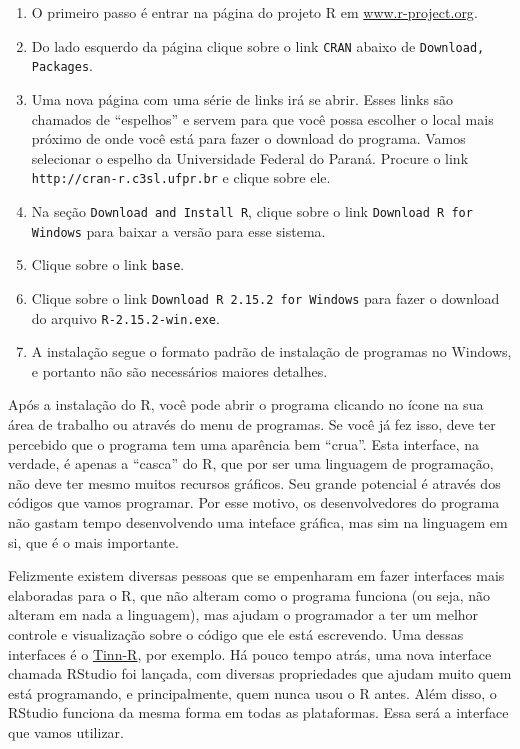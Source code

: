 \documentclass[a4paper,12pt]{article}\usepackage[]{graphicx}\usepackage[]{color}
\providecommand{\R}{\textsf{R}\xspace}
\providecommand{\RStudio}{\textsf{RStudio}\xspace}
\begin{document}
\begin{enumerate}
\item O primeiro passo é entrar na página do projeto \R em
\url{www.r-project.org}.
\item Do lado esquerdo da página clique sobre o link \texttt{CRAN}
  abaixo de \texttt{Download, Packages}.
\item Uma nova página com uma série de links irá se abrir. Esses links
  são chamados de ``espelhos'' e servem para que você possa escolher o
  local mais próximo de onde você está para fazer o download do
  programa. Vamos selecionar o espelho da Universidade Federal do
  Paraná. Procure o link \texttt{http://cran-r.c3sl.ufpr.br} e clique sobre
  ele.
\item Na seção \texttt{Download and Install R}, clique sobre o link
  \texttt{Download R for Windows} para baixar a versão para esse
  sistema.
\item Clique sobre o link \texttt{base}.
\item Clique sobre o link \texttt{Download R 2.15.2 for Windows} para
  fazer o download do arquivo \texttt{R-2.15.2-win.exe}.
\item A instalação segue o formato padrão de instalação de programas no
  Windows, e portanto não são necessários maiores detalhes.
\end{enumerate}

Após a instalação do \R, você pode abrir o programa clicando no ícone na
sua área de trabalho ou através do menu de programas. Se você já fez
isso, deve ter percebido que o programa tem uma aparência bem
``crua''. Esta interface, na verdade, é apenas a ``casca'' do \R, que
por ser uma linguagem de programação, não deve ter mesmo muitos recursos
gráficos. Seu grande potencial é através dos códigos que vamos
programar. Por esse motivo, os desenvolvedores do programa não gastam
tempo desenvolvendo uma inteface gráfica, mas sim na linguagem em si,
que é o mais importante.

Felizmente existem diversas pessoas que se empenharam em fazer
interfaces mais elaboradas para o \R, que não alteram como o programa
funciona (ou seja, não alteram em nada a linguagem), mas ajudam o
programador a ter um melhor controle e visualização sobre o código que
ele está escrevendo. Uma dessas interfaces é o
\href{http://www.sciviews.org/Tinn-R}{Tinn-R}, por exemplo. Há pouco
tempo atrás, uma nova interface chamada \RStudio foi lançada, com
diversas propriedades que ajudam muito quem está programando, e
principalmente, quem nunca usou o \R antes. Além disso, o \RStudio
funciona da mesma forma em todas as plataformas. Essa será a interface
que vamos utilizar.
\end{document}

